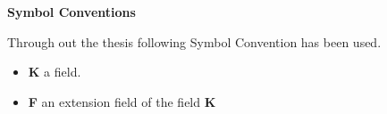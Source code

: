 
{\LARGE {\textbf{Symbol Conventions}}}

  \vspace{9mm}

Through out the thesis following Symbol Convention has been used.\\[4mm]

\begin{itemize}
\item \textbf{K} \hspace{5mm} a field.
\item \textbf{F} \hspace{5mm} an extension field of the field \textbf{K}
\end{itemize}
